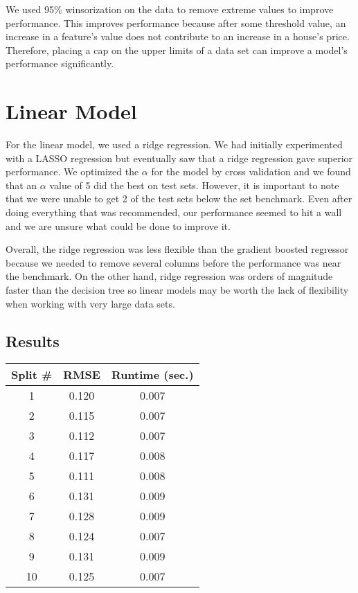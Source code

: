 \documentclass{article}
\begin{document}
We used 95\% winsorization on the data to remove extreme values to improve performance.
This improves performance because after some threshold value, an increase in a feature's 
value does not contribute to an increase in a house's price. Therefore, placing a cap on the upper limits of a data set can improve a model's performance significantly. 

\section{Linear Model}

For the linear model, we used a ridge regression. We had initially experimented with a 
LASSO regression but eventually saw that a ridge regression gave superior performance. 
We optimized the $\alpha$ for the model by cross validation and we found that an $\alpha$ 
value of 5 did the best on test sets. However, it is important to note that we were unable 
to get 2 of the test sets below the set benchmark. Even after doing everything that was 
recommended, our performance seemed to hit a wall and we are unsure what could be done 
to improve it. 

Overall, the ridge regression was less flexible than the gradient boosted regressor because we needed to remove several columns before the performance was near the benchmark. On the other hand, ridge regression was orders of magnitude faster than the decision tree so linear models may be worth the lack of flexibility when working with 
very large data sets. 

\subsection{Results}

\begin{center} 
    \begin{tabular}{ | c |  c |  c |} 
        \hline
        Split \# & RMSE & Runtime (sec.) \\ 
        \hline\hline
        1 & 0.120 & 0.007 \\ 
        \hline 
        2 & 0.115 & 0.007 \\ 
        \hline 
        3 & 0.112 & 0.007 \\ 
        \hline 
        4 & 0.117 & 0.008\\ 
        \hline 
        5 & 0.111 & 0.008 \\ 
        \hline 
        6 & 0.131 & 0.009 \\ 
        \hline
         7 & 0.128 & 0.009 \\ 
         \hline 
        8 & 0.124 & 0.007 \\ 
        \hline 
        9 & 0.131 & 0.009 \\ 
        \hline
        10 & 0.125 & 0.007 \\ 
        \hline 
    \end{tabular} 
\end{center}
\end{document}
